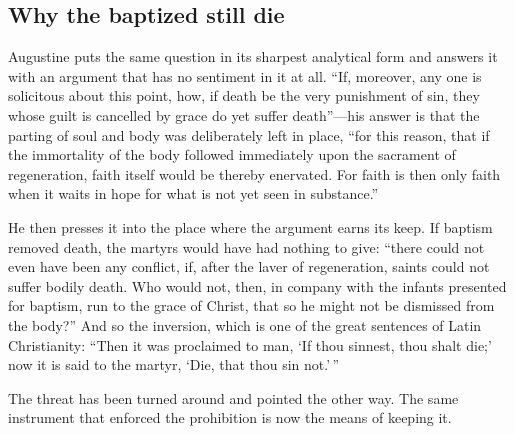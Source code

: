 \subsection{Why the baptized still die}

Augustine puts the same question in its sharpest analytical form and answers it with an argument that has no sentiment in it at all. ``If, moreover, any one is solicitous about this point, how, if death be the very punishment of sin, they whose guilt is cancelled by grace do yet suffer death''---his answer is that the parting of soul and body was deliberately left in place, ``for this reason, that if the immortality of the body followed immediately upon the sacrament of regeneration, faith itself would be thereby enervated. For faith is then only faith when it waits in hope for what is not yet seen in substance.''

He then presses it into the place where the argument earns its keep. If baptism removed death, the martyrs would have had nothing to give: ``there could not even have been any conflict, if, after the laver of regeneration, saints could not suffer bodily death. Who would not, then, in company with the infants presented for baptism, run to the grace of Christ, that so he might not be dismissed from the body?'' And so the inversion, which is one of the great sentences of Latin Christianity: ``Then it was proclaimed to man, `If thou sinnest, thou shalt die;' now it is said to the martyr, `Die, that thou sin not.'\,''

The threat has been turned around and pointed the other way. The same instrument that enforced the prohibition is now the means of keeping it.

